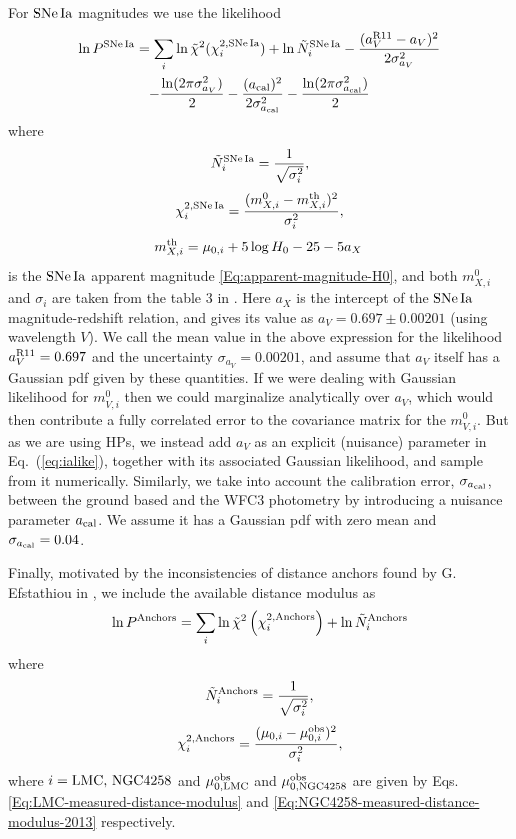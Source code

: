 For $\mathrm{SNe\,Ia}$ magnitudes we use the likelihood
\begin{multline}
\ln P^{\mathrm{SNe\,Ia}}  =  \sum_{i} \ln \tilde{\chi}^{2}(\chi^{2,\mathrm{SNe\,Ia}}_{i}) + \ln \tilde{N}^{\mathrm{SNe\,Ia}}_{i} - \frac{(a^{\rm R11}_V - a_V)^2}{2 \sigma_{a_V}^2} \\
- \frac{\ln (2\pi\sigma_{a_V}^2)}{2} - \frac{(a_{\rm cal})^2}{2 \sigma_{a_{\rm cal}}^2} - \frac{\ln (2\pi\sigma_{a_{\rm cal}}^2)}{2}  
\label{eq:ialike}
\end{multline}
where 
\begin{equation}
\tilde{N}^{\mathrm{SNe\,Ia}}_{i} = \frac{1}{\sqrt{\sigma_{i}^2}},
\end{equation}
\begin{equation}
\chi^{2,\mathrm{SNe\,Ia}}_{i} = \frac{(m^0_{X,i} - m^{\mathrm{th}}_{X,i})^2}{\sigma_{i}^2},
\end{equation}
\begin{equation}
m^{\mathrm{th}}_{X,i} = \mu_{0,i} + 5 \log H_0 - 25 - 5 a_X \, 
\end{equation}
is the $\mathrm{SNe\,Ia}$ apparent magnitude \eqref{Eq:apparent-magnitude-H0}, and both $m^0_{X,i}$ and $\sigma_i$ are taken from the table 3 in \cite{Riess:2011yx}. Here $a_X$ is the intercept of the $\mathrm{SNe\,Ia}$ magnitude-redshift relation, and \cite{Riess:2011yx} gives its value as $a_V = 0.697\pm0.00201$ (using wavelength $V$). We call the mean value 
in the above expression for the likelihood $a^{\rm R11}_V = 0.697$ and the uncertainty $\sigma_{a_V} = 0.00201$, and assume that $a_V$ itself has a Gaussian pdf given by these quantities. If we were dealing with Gaussian likelihood for $m^0_{V,i}$ then we could marginalize analytically over $a_V$, which would then contribute a fully correlated error to the covariance matrix for the $m^0_{V,i}$. But as we are using HPs, we instead add $a_V$ as an explicit (nuisance) parameter in Eq.\ (\ref{eq:ialike}), together with its associated Gaussian likelihood, and sample from it numerically. Similarly, we take into account the calibration error, $\sigma_{a_{\rm cal}}$, between the ground based and the WFC3 photometry by introducing a nuisance parameter $a_{\rm cal}$. We assume it has a Gaussian pdf with zero mean and $\sigma_{a_{\rm cal}}=0.04$.

Finally, motivated by the inconsistencies of distance anchors found by G. Efstathiou in  \cite{Efstathiou:2013via}, we include the available distance modulus as
\begin{equation}
\ln P^{\mathrm{Anchors}} = \sum_{i} \ln \tilde{\chi}^{2}\left( \chi^{2,\mathrm{Anchors}}_{i} \right) + \ln \tilde{N}^{\mathrm{Anchors}}_{i} 
\end{equation}
where
\begin{equation}
\tilde{N}^{\mathrm{Anchors}}_{i} = \frac{1}{\sqrt{\sigma_{i}^2}},
\end{equation}
\begin{equation}
\chi^{2,\mathrm{Anchors}}_i = \frac{(\mu_{0,i} - \mu^{\mathrm{obs}}_{0,i})^2}{\sigma^2_i},
\end{equation}
where $i=\mathrm{LMC},\,\mathrm{NGC4258}$ and $\mu^{\mathrm{obs}}_{0,\mathrm{LMC}}$ and $\mu^{\mathrm{obs}}_{\rm 0,\mathrm{NGC4258}}$ are given by Eqs. \eqref{Eq:LMC-measured-distance-modulus} and \eqref{Eq:NGC4258-measured-distance-modulus-2013} respectively.

